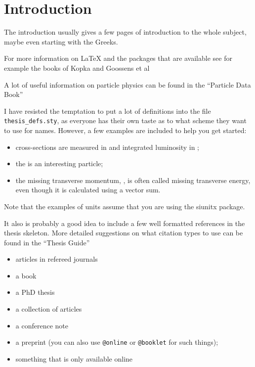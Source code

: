 
\chapter{Introduction}
\label{sec:intro}

The introduction usually gives a few pages of introduction to the
whole subject, maybe even starting with the Greeks.

For more information on \LaTeX{} and the packages that are available
see for example the books of Kopka%
 and Goossens et
al%

A lot of useful information on particle physics can be found in the
\enquote{Particle Data Book}%

I have resisted the temptation to put a lot of definitions into the
file \texttt{thesis\_defs.sty}, as everyone has their own taste as
to what scheme they want to use for names.
However, a few examples are included to help you get started:
\begin{itemize}
\setlength{\itemsep}{0pt}\setlength{\parskip}{0pt}
\item cross-sections are measured in \si{\pb} and integrated
  luminosity in \si{\invpb};
\item the \KoS is an interesting particle;
\item the missing transverse momentum, \pTmiss, is often called
  missing transverse energy, even though it is calculated using a vector sum.
\end{itemize}
Note that the examples of units assume that you are using the
\textsf{siunitx} package.

It also is probably a good idea to include a few well formatted
references in the thesis skeleton. More detailed suggestions on what
citation types to use can be found in the \enquote{Thesis Guide}%
\begin{itemize}
\item articles in refereed journals%
\item a book%
\item a PhD thesis%
\item a collection of articles%
\item a conference note%
\item a preprint%
(you can also use
  \texttt{@online} or \texttt{@booklet} for such things);
\item something that is only available online%
\end{itemize}

